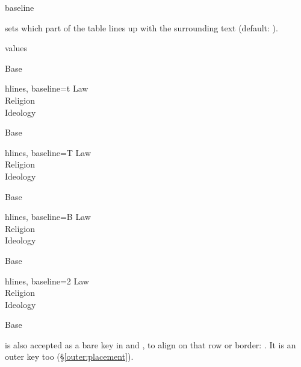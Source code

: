 \begin{codedescribe}[
    key,
    new=2021G,
    update=2022A
  ]{baseline}
  \begin{codesyntax}
  \end{codesyntax}
   sets which part of the table lines up with the surrounding text (default: ).
  \begin{describelist*}{values}
  \end{describelist*}

  \begin{codestore}[st=table:baseline]
    Base\begin{tblr}{hlines, baseline=t}
      Law \\ Religion \\ Ideology
    \end{tblr}Base\begin{tblr}{hlines, baseline=T}
      Law \\ Religion \\ Ideology
    \end{tblr}Base\begin{tblr}{hlines, baseline=B}
      Law \\ Religion \\ Ideology
    \end{tblr}Base\begin{tblr}{hlines, baseline=2}
      Law \\ Religion \\ Ideology
    \end{tblr}Base\end{codestore}
  \begin{center}
  \end{center}
  \begin{tsremark}
     is also accepted as a bare key in  and , to align on that row or border: . It is an outer key too (\S\ref{outer:placement}).
  \end{tsremark}
\end{codedescribe}

